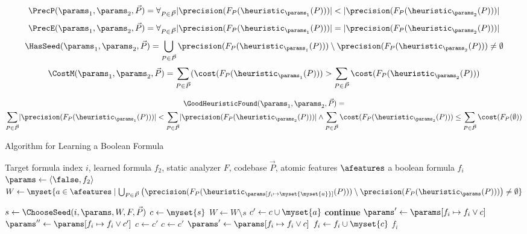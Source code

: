 \[
\PrecP(\params_1, \params_2, \vec{P}) = \forall_{P \in \vec{P}}\lvert\precision(F_P(\heuristic_{\params_1}(P)))\rvert < \lvert\precision(F_P(\heuristic_{\params_2}(P)))\rvert
\]
\[
\PrecE(\params_1, \params_2, \vec{P}) = \forall_{P \in \vec{P}}\lvert\precision(F_P(\heuristic_{\params_1}(P)))\rvert = \lvert\precision(F_P(\heuristic_{\params_2}(P)))\rvert
\]
\[
\HasSeed(\params_1, \params_2, \vec{P})=\bigcup_{P \in \vec{P}}\precision(F_P(\heuristic_{\params_1}(P))) \setminus
                  \precision(F_P(\heuristic_{\params_2}(P)))  \neq \emptyset
\]
\[
\CostM(\params_1, \params_2, \vec{P})=\sum_{P \in \vec{P}}(\cost(F_P(\heuristic_{\params_1}(P))) > \sum_{P \in \vec{P}}\cost(F_P(\heuristic_{\params_2}(P)))
\]

\begin{multline*}
\GoodHeuristicFound(\params_1, \params_2, \vec{P})=\\ \sum_{P \in \vec{P}}\lvert\precision(F_P(\heuristic_{\params_1}(P)))\rvert < \sum_{P \in \vec{P}}\lvert\precision(F_P(\heuristic_{\params_2}(P)))\rvert \wedge \sum_{P \in \vec{P}}\cost(F_P(\heuristic_{\params_2}(P))) \le \sum_{P \in \vec{P}}\cost(F_P(\emptyset))
\end{multline*}

\begin{algorithm}[t]
	\caption{Algorithm for Learning a Boolean Formula}\label{alg:learning-inner}
    \small
	\begin{algorithmic}[1]
		\Require Target formula index $i$, learned formula $f_2$, static analyzer $F$, codebase $\vec{P}$,
		atomic features $\afeatures$
		\Ensure a boolean formula $f_i$
		\State $\params \gets \langle \false, f_2 \rangle$
		\State $W \gets \myset{a \in \afeatures \mid
                  \bigcup_{P \in \vec{P}} \big( \precision(F_P(\heuristic_{\params[f_i\mapsto \myset{\myset{a}}]}(P))) \setminus \precision(F_P(\heuristic_{\params}(P)))\big) \neq \emptyset }$
		
		  \State $s \gets \ChooseSeed(i,\params,W,F,\vec{P})$
		  \State $c \gets \myset{s}$	
		  \State $W \gets W \setminus s$
  	        \State $c' \gets c \cup \myset{a}$
  	        \State \textbf{continue}
  	        \EndIf
  	        \State $\params' \gets \params[f_i \mapsto f_i\vee c]$ 
  	        \State $\params'' \gets \params[f_i \mapsto f_i\vee c']$ 
  	          \State $c \gets c'$
  	          \State $c \gets c'$
  	        \EndIf
		  \EndWhile
		  \State $\params' \gets \params[f_i \mapsto f_i \vee c]$
		    \State $f_i \gets f_i \cup \myset{c}$
		  \EndIf
		\EndWhile
		\State \Return $f_i$
		\EndProcedure
	\end{algorithmic}
\end{algorithm}


